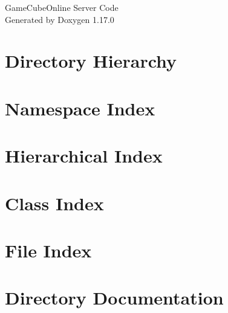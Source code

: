 \documentclass[twoside]{book}
\newcommand{\+}{\discretionary{\mbox{\scriptsize$\hookleftarrow$}}{}{}}
\newcommand{\clearemptydoublepage}{%
    \newpage{\pagestyle{empty}\cleardoublepage}%
  }
\begin{document}
  \raggedbottom
    \hypersetup{pageanchor=false,
                bookmarksnumbered=true,
                pdfencoding=unicode
               }
  \begin{titlepage}
  \vspace*{7cm}
  \begin{center}%
  {\Large Game\+Cube\+Online Server Code}\\
  \vspace*{1cm}
  {\large Generated by Doxygen 1.17.0}\\
  \end{center}
  \end{titlepage}
  \clearemptydoublepage
  \tableofcontents
  \clearemptydoublepage
  \hypersetup{pageanchor=true}
\chapter{Directory Hierarchy}

\chapter{Namespace Index}

\chapter{Hierarchical Index}

\chapter{Class Index}

\chapter{File Index}

\chapter{Directory Documentation}












\end{document}
